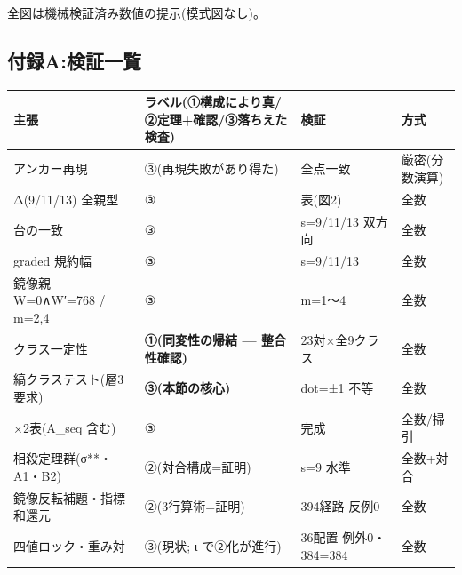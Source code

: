 \documentclass[
]{ltjsarticle}
\newcounter{none} %
\begin{document}
全図は機械検証済み数値の提示(模式図なし)。

\subsection{付録A:検証一覧}\label{ux4ed8ux9332aux691cux8a3cux4e00ux89a7}

{\def\LTcaptype{none} %
\begin{longtable}[]{@{}
  >{\raggedright\arraybackslash}p{}
  >{\raggedright\arraybackslash}p{}
  >{\raggedright\arraybackslash}p{}
  >{\raggedright\arraybackslash}p{}@{}}
\toprule\noalign{}
\begin{minipage}[b]{\linewidth}\raggedright
主張
\end{minipage} & \begin{minipage}[b]{\linewidth}\raggedright
ラベル(①構成により真/②定理+確認/③落ちえた検査)
\end{minipage} & \begin{minipage}[b]{\linewidth}\raggedright
検証
\end{minipage} & \begin{minipage}[b]{\linewidth}\raggedright
方式
\end{minipage} \\
\midrule\noalign{}
\endhead
\bottomrule\noalign{}
\endlastfoot
アンカー再現 & ③(再現失敗があり得た) & 全点一致 & 厳密(分数演算) \\
Δ(9/11/13) 全親型 & ③ & 表(図2) & 全数 \\
台の一致 & ③ & s=9/11/13 双方向 & 全数 \\
graded 規約幅 & ③ & s=9/11/13 & 全数 \\
鏡像親 W=0∧W′=768 / m=2,4 & ③ & m=1〜4 & 全数 \\
クラス一定性 & \textbf{①(同変性の帰結 --- 整合性確認)} & 23対×全9クラス
& 全数 \\
縞クラステスト(層3要求) & \textbf{③(本節の核心)} & dot=±1 不等 & 全数 \\
2×2表(A\_seq 含む) & ③ & 完成 & 全数/掃引 \\
相殺定理群(σ**・A1・B2) & ②(対合構成=証明) & s=9 水準 & 全数+対合 \\
鏡像反転補題・指標和還元 & ②(3行算術=証明) & 394経路 反例0 & 全数 \\
四値ロック・重み対 & ③(現状; ι で②化が進行) & 36配置 例外0・384=384 &
全数 \\
\end{longtable}
}
\end{document}
